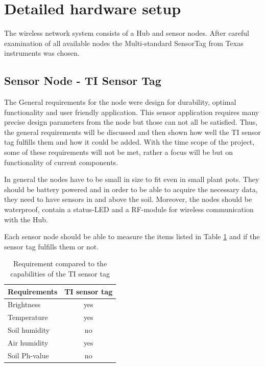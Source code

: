 \section{Detailed hardware setup}

The wireless network system consists of a Hub and sensor nodes. After careful examination of all available nodes the Multi-standard SensorTag from Texas instruments \cite{TIsensortag} was chosen.


\subsection{Sensor Node - TI Sensor Tag}

The General requirements for the node were design for durability, optimal functionality and user friendly application. This sensor application requires many precise design parameters from the node but those can not all be satisfied. Thus, the general requirements will be discussed and then shown how well the TI sensor tag fulfills them and how it could be added. With the time scope of the project, some of these requirements will not be met, rather a focus will be but on functionality of current components.

In general the nodes have to be small in size to fit even in small plant pots. They should be battery powered and in order to be able to acquire the necessary data, they need to have sensors in and above the soil. Moreover, the nodes should be waterproof, contain a status-LED and a RF-module for wireless communication with the Hub.

Each sensor node should be able to measure the items listed in Table \ref{list-req} and if the sensor tag fulfills them or not.
\begin{table}[htbp]
	\centering
	\begin{tabular}{lc}
		\toprule
		Requirements & \multicolumn{1}{l}{TI sensor tag} \\ 
		\midrule
		Brightness & yes \\ 
		Temperature & yes \\ 
		Soil humidity & no \\ 
		Air humidity & yes \\ 
		Soil Ph-value & no \\
		\bottomrule 
	\end{tabular}
	\vspace{0.1cm}
	\caption{Requirement compared to the capabilities of the TI sensor tag}
	\label{list-req}
\end{table}



